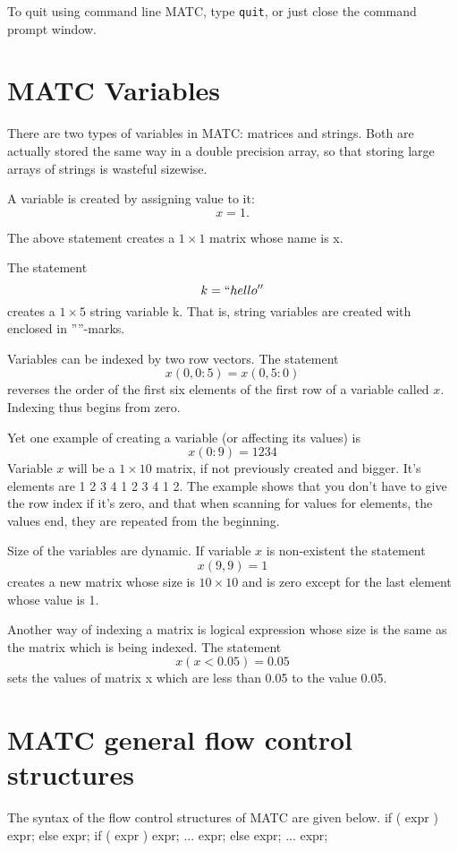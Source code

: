 \noindent To quit using command line MATC, type \texttt{quit}, or just close the command prompt window.

\section{MATC Variables}

There are two types of variables in MATC: matrices and strings. 
Both are actually stored the same way in a double precision array, so that storing large arrays of strings is wasteful sizewise. 

A variable is created by assigning value to it: 
\[
  x = 1. 
\]
 
The above statement creates a $1 \times 1$ matrix whose name is x. 

The statement 
\[
  k = ``hello''
\]
 creates a $1 \times 5$ string variable k. That is, string variables are created with enclosed in ''''-marks. 

Variables can be indexed by two row vectors. The statement 
\[
   x(0,0:5) = x(0,5:0)
\]
reverses the order of the first six elements of the first row of a variable called $x$. 
Indexing thus begins from zero. 

Yet one example of creating a variable (or affecting its values) is 
\[
  x(0:9) = 1 2 3 4
\]
 Variable $x$ will be a $1 \times 10$ matrix, if not previously created and bigger. 
It's elements are 1 2 3 4 1 2 3 4 1 2.
The example shows that you don't have to give the row index if it's zero, and that when scanning for values for elements, the values end, they are repeated from the beginning. 

Size of the variables are dynamic. If variable $x$ is non-existent the statement 
\[
  x(9,9) = 1
\]
creates a new matrix whose size is $10 \times 10$ and is zero except for the last element whose value is 1. 

Another way of indexing a matrix is logical expression whose size is the same as the matrix which is being indexed. The statement 
\[
  x(x < 0.05) = 0.05
\]
sets the values of matrix x which are less than 0.05 to the value 0.05. 



\section{MATC general flow control structures}

The syntax of the flow control structures of MATC are given below. 
\ttbegin
if ( expr ) expr; else expr;
if ( expr )
{
    expr;
    ...
    expr;
} else {
    expr;
    ...
    expr;
}

